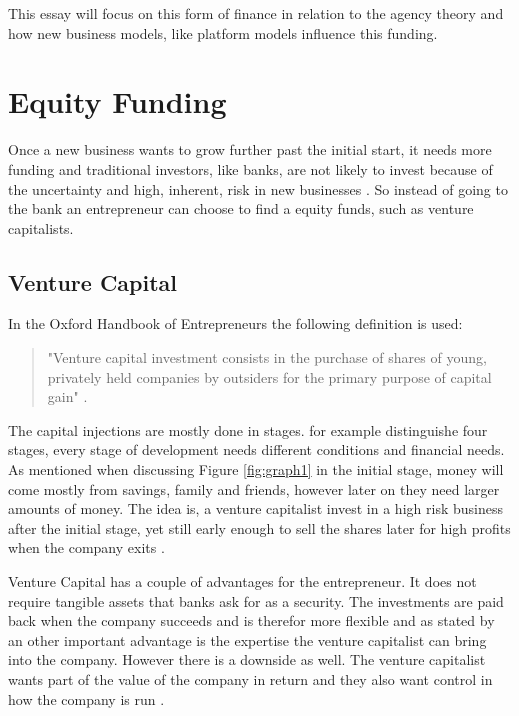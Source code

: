 \documentclass[a4paper, 11pt]{article}
\begin{document}
This essay will focus on this form of finance in relation to the agency theory and how new business models, like platform models influence this funding.

\section{Equity Funding}

Once a new business wants to grow further past the initial start, it needs more funding and traditional investors, like banks, are not likely to invest because of the uncertainty and high, inherent, risk in new businesses \citep{Osnabrugge2000}. So instead of going to the bank an entrepreneur can choose to find a equity funds, such as venture capitalists.

\subsection{Venture Capital}

In the Oxford Handbook of Entrepreneurs the following definition is used:

\begin{quote}
"Venture capital investment consists in the purchase of shares of young, privately held companies by outsiders for the primary purpose of capital gain" \citep[P.355]{casson2008oxford}.
\end{quote}

The capital injections are mostly done in stages. \cite{TiddBessant} for example distinguishe four stages, every stage of development needs different conditions and financial needs. As mentioned when discussing Figure \ref{fig:graph1} in the initial stage, money will come mostly from savings, family and friends, however later on they need larger amounts of money. The idea is, a venture capitalist invest in a high risk business after the initial stage, yet still early enough to sell the shares later for high profits when the company exits \citep{TiddBessant}.

Venture Capital has a couple of advantages for the entrepreneur. It does not require tangible assets that banks ask for as a security. The investments are paid back when the company succeeds and is therefor more flexible and as stated by \cite{casson2008oxford} an other important advantage is the expertise the venture capitalist can bring into the company. However there is a downside as well. The venture capitalist wants part of the value of the company in return and they also want control in how the company is run \citep{casson2008oxford}.
\end{document}
